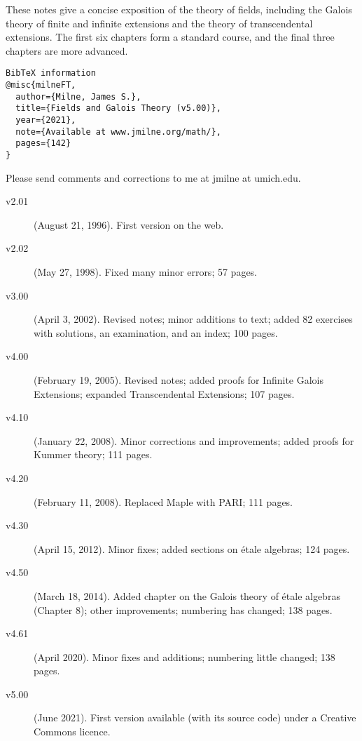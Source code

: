 \documentclass[a4paper,11pt,final,openany]{memoir}
\theoremstyle{nonumberplain}
\begin{document}
\raggedbottom\clearpage{}

\vspace*{0.1in} \noindent These
notes give a concise exposition of the theory of fields, including the Galois
theory of finite and infinite extensions and the theory of transcendental
extensions. The first six chapters form a standard course, and the final three
chapters are more advanced.\vfill

\begin{small}
\begin{verbatim}
BibTeX information
@misc{milneFT,
  author={Milne, James S.},
  title={Fields and Galois Theory (v5.00)},
  year={2021},
  note={Available at www.jmilne.org/math/},
  pages={142}
}
\end{verbatim}
\end{small}

\vfill

\noindent Please send comments and corrections to me at jmilne at umich.edu.
\begin{description}
\item[v2.01] (August 21, 1996). First version on the web.

\item[v2.02] (May 27, 1998). Fixed many minor errors; 57 pages.

\item[v3.00] (April 3, 2002). Revised notes; minor additions to text; added 82
exercises with solutions, an examination, and an index; 100 pages.

\item[v4.00] (February 19, 2005). Revised notes; added proofs for Infinite
Galois Extensions; expanded Transcendental Extensions; 107 pages.

\item[v4.10] (January 22, 2008). Minor corrections and improvements; added
proofs for Kummer theory; 111 pages.

\item[v4.20] (February 11, 2008). Replaced Maple with PARI; 111 pages.

\item[v4.30] (April 15, 2012). Minor fixes; added sections on \'etale
algebras; 124 pages.

\item[v4.50] (March 18, 2014). Added chapter on the Galois theory of \'etale
algebras (Chapter 8); other improvements; numbering has changed; 138 pages.

\item[v4.61] (April 2020). Minor fixes and additions; numbering little
changed; 138 pages.

\item[v5.00] (June 2021). First version available (with its source code) under a Creative Commons licence.
\end{description}
\end{document}
